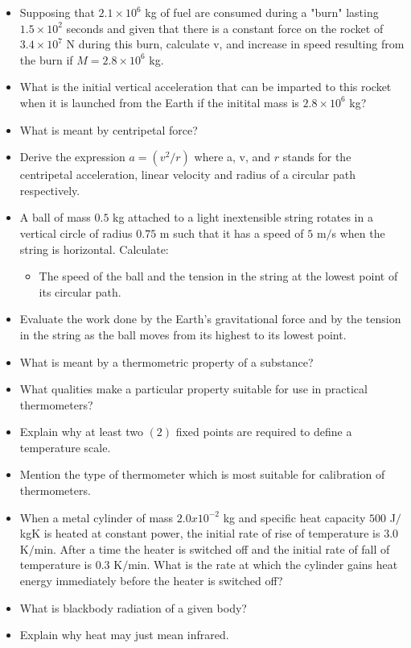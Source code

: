 \documentclass{article}
\begin{document}
\begin{itemize}
\item Supposing that $ 2.1\times10^{6}$ kg of fuel are consumed during a "burn" lasting $ 1.5\times10^{2}$ seconds and given that there is a constant force on the rocket of $ 3.4\times 10^{7}$ N during this burn, calculate v, and increase in speed resulting from the burn if $ M=2.8\times10^{6}$ kg.  
\item What is the initial vertical acceleration that can be imparted to this rocket when it is launched from the Earth if the initital mass is $ 2.8\times 10^{6}$ kg?
\item What is meant by centripetal force?
\item Derive the expression $ a =(v^{2}/r)$ where a, v, and $ r$ stands for the centripetal acceleration, linear velocity and radius of a circular path respectively.  
\item A ball of mass $ 0.5$ kg attached to a light inextensible string rotates in a vertical circle of radius $ 0.75$ m such that it has a speed of $ 5$ m$/$s when the string is horizontal.  Calculate:
 \begin{itemize}
\item  The speed of the ball and the tension in the string at the lowest point of its circular path.
\end{itemize}
\item Evaluate the work done by the Earth's gravitational force and by the tension in the string as the ball moves from its highest to its lowest point.
\item What is meant by a thermometric property of a substance?
\item What qualities make a particular property suitable for use in practical thermometers?
\item Explain why at least two $ (2)$ fixed points are required to define a temperature scale.
\item Mention the type of thermometer which is most suitable for calibration of thermometers.
\item When a metal cylinder of mass $ 2.0x10^{-2}$ kg and specific heat capacity $ 500$ J$/$kgK is heated at constant power, the initial rate of rise of temperature is $ 3.0$ K$/$min.  After a time the heater is switched off and the initial rate of fall of temperature is $ 0.3$ K$/$min.  What is the rate at which the cylinder gains heat energy immediately before the heater is switched off?
\item What is blackbody radiation of a given body?
\item Explain why heat may just mean infrared.

\end{itemize}
\end{document}
